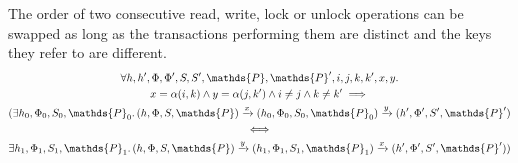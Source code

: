 \lem The order of two consecutive read, write, lock or unlock operations can be swapped as long as the transactions performing them are distinct and the keys they refer to are different.
\begin{gather*}
	\forall h, h', \Phi, \Phi', S, S', \mathds{P}, \mathds{P}', i, j, k, k', x, y \ldotp \\
	x = \alpha(i, k) \land y = \alpha(j, k') \land i \neq j \land k \neq k' \implies \\
	(\exists h_0, \Phi_0, S_0, \mathds{P}_0 \ldotp
	(h, \Phi, S, \mathds{P}) \xrightarrow{x} (h_0, \Phi_0, S_0, \mathds{P}_0)  \xrightarrow{y} (h', \Phi', S', \mathds{P}') \\
	\iff \\
	\exists h_1, \Phi_1, S_1, \mathds{P}_1 \ldotp
	(h, \Phi, S, \mathds{P}) \xrightarrow{y} (h_1, \Phi_1, S_1, \mathds{P}_1) \xrightarrow{x} (h', \Phi', S', \mathds{P}'))
\end{gather*}

